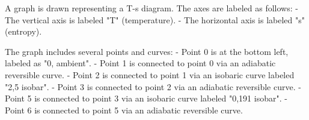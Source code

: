A graph is drawn representing a T-s diagram. The axes are labeled as follows:  
- The vertical axis is labeled "T" (temperature).  
- The horizontal axis is labeled "s" (entropy).  

The graph includes several points and curves:  
- Point 0 is at the bottom left, labeled as "0, ambient".  
- Point 1 is connected to point 0 via an adiabatic reversible curve.  
- Point 2 is connected to point 1 via an isobaric curve labeled "2,5 isobar".  
- Point 3 is connected to point 2 via an adiabatic reversible curve.  
- Point 5 is connected to point 3 via an isobaric curve labeled "0,191 isobar".  
- Point 6 is connected to point 5 via an adiabatic reversible curve.